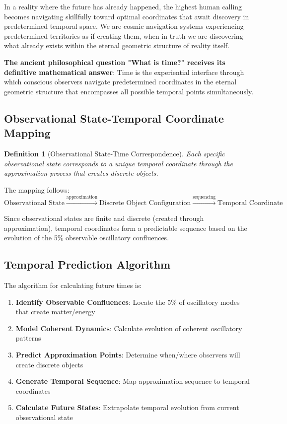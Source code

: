 \documentclass[11pt]{article}
\newtheorem{definition}[theorem]{Definition}
\theoremstyle{remark}
\begin{document}
In a reality where the future has already happened, the highest human calling becomes navigating skillfully toward optimal coordinates that await discovery in predetermined temporal space. We are cosmic navigation systems experiencing predetermined territories as if creating them, when in truth we are discovering what already exists within the eternal geometric structure of reality itself.

\textbf{The ancient philosophical question "What is time?" receives its definitive mathematical answer}: Time is the experiential interface through which conscious observers navigate predetermined coordinates in the eternal geometric structure that encompasses all possible temporal points simultaneously.

\subsection{Observational State-Temporal Coordinate Mapping}

\begin{definition}[Observational State-Time Correspondence]
Each specific observational state corresponds to a unique temporal coordinate through the approximation process that creates discrete objects.
\end{definition}

The mapping follows:
$$\text{Observational State} \xrightarrow{\text{approximation}} \text{Discrete Object Configuration} \xrightarrow{\text{sequencing}} \text{Temporal Coordinate}$$

Since observational states are finite and discrete (created through approximation), temporal coordinates form a predictable sequence based on the evolution of the 5\% observable oscillatory confluences.

\subsection{Temporal Prediction Algorithm}

The algorithm for calculating future times is:

\begin{enumerate}
\item \textbf{Identify Observable Confluences}: Locate the 5\% of oscillatory modes that create matter/energy
\item \textbf{Model Coherent Dynamics}: Calculate evolution of coherent oscillatory patterns
\item \textbf{Predict Approximation Points}: Determine when/where observers will create discrete objects
\item \textbf{Generate Temporal Sequence}: Map approximation sequence to temporal coordinates
\item \textbf{Calculate Future States}: Extrapolate temporal evolution from current observational state
\end{enumerate}
\end{document}
